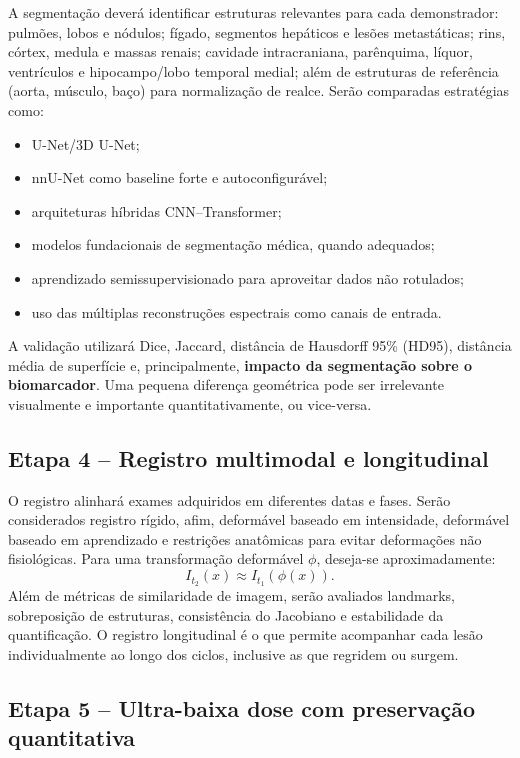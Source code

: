 \documentclass[11pt,a4paper]{article}
\begin{document}
A segmentação deverá identificar estruturas relevantes para cada demonstrador: pulmões, lobos e nódulos; fígado, segmentos hepáticos e lesões metastáticas; rins, córtex, medula e massas renais; cavidade intracraniana, parênquima, líquor, ventrículos e hipocampo/lobo temporal medial; além de estruturas de referência (aorta, músculo, baço) para normalização de realce. Serão comparadas estratégias como:

\begin{itemize}
\item U-Net/3D U-Net;
\item nnU-Net como baseline forte e autoconfigurável;
\item arquiteturas híbridas CNN--Transformer;
\item modelos fundacionais de segmentação médica, quando adequados;
\item aprendizado semissupervisionado para aproveitar dados não rotulados;
\item uso das múltiplas reconstruções espectrais como canais de entrada.
\end{itemize}

A validação utilizará Dice, Jaccard, distância de Hausdorff 95\% (HD95), distância média de superfície e, principalmente, \textbf{impacto da segmentação sobre o biomarcador}. Uma pequena diferença geométrica pode ser irrelevante visualmente e importante quantitativamente, ou vice-versa.

\subsection{Etapa 4 -- Registro multimodal e longitudinal}

O registro alinhará exames adquiridos em diferentes datas e fases. Serão considerados registro rígido, afim, deformável baseado em intensidade, deformável baseado em aprendizado e restrições anatômicas para evitar deformações não fisiológicas. Para uma transformação deformável $\phi$, deseja-se aproximadamente:
\begin{equation}
I_{t_{2}}(x) \approx I_{t_{1}}(\phi(x)).
\end{equation}
Além de métricas de similaridade de imagem, serão avaliados landmarks, sobreposição de estruturas, consistência do Jacobiano e estabilidade da quantificação. O registro longitudinal é o que permite acompanhar cada lesão individualmente ao longo dos ciclos, inclusive as que regridem ou surgem.

\subsection{Etapa 5 -- Ultra-baixa dose com preservação quantitativa}
\end{document}
